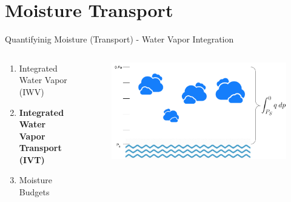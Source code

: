\section{Moisture Transport}

\begin{frame}{Quantifyinig Moisture (Transport) - Water Vapor Integration}
  \begin{columns}
    \begin{column}{.5 \textwidth}
    \begin{enumerate}
    \item Integrated Water Vapor (IWV) \cite{gimeno_atmospheric_2014, eiras-barca_seasonal_2016, bao_interpretation_2006, ma_atmospheric_nodate}
    \item \textbf{Integrated Water Vapor Transport (IVT)} \cite{zhu_proposed_1998, sousa_north_2020, jiang_impact_2017, ayantobo_integrated_2022, allan_diagnosing_2016, ralph_dropsonde_2017, ralph_scale_2019}
    \item Moisture Budgets \cite{seager_mechanisms_2020, yang_moisture_2022}
  \end{enumerate}
      
    \end{column}
    \begin{column}{.5 \textwidth}
          \begin{figure}[h]
      \centering
      \includegraphics[width=\columnwidth]{imglib/water_vapor_integration.png}
    \end{figure}
    \end{column}
    
  \end{columns}
\end{frame}

